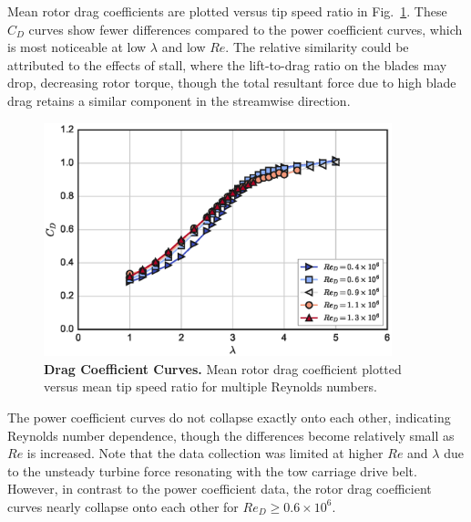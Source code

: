 \documentclass[10pt,letterpaper]{article}
\begin{document}
Mean rotor drag coefficients are plotted versus tip speed ratio in
Fig.~\ref{fig:cd-curves}. These $C_D$ curves show fewer differences compared to
the power coefficient curves, which is most noticeable at low $\lambda$ and low
$Re$. The relative similarity could be attributed to the effects of stall, where
the lift-to-drag ratio on the blades may drop, decreasing rotor torque, though
the total resultant force due to high blade drag retains a similar component in
the streamwise direction.

\begin{figure}
    \includegraphics[width=0.9\textwidth]{figures/cd_curves.eps}

    \caption{{\bf Drag Coefficient Curves.} Mean rotor drag coefficient plotted
    versus mean tip speed ratio for multiple Reynolds numbers.}

    \label{fig:cd-curves}
\end{figure}

The power coefficient curves do not collapse exactly onto each other, indicating
Reynolds number dependence, though the differences become relatively small as
$Re$ is increased. Note that the data collection was limited at higher $Re$ and
$\lambda$ due to the unsteady turbine force resonating with the tow carriage
drive belt. However, in contrast to the power coefficient data, the rotor drag
coefficient curves nearly collapse onto each other for $Re_D \ge 0.6 \times
10^6$.
\end{document}
